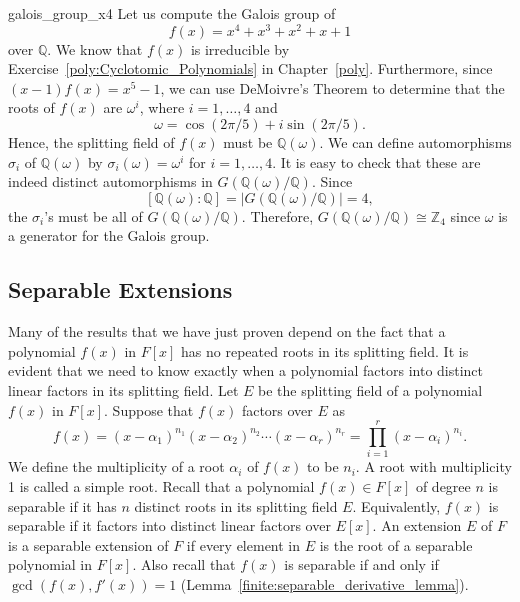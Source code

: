 \begin{example}{galois_group_x4}
Let us compute the Galois group of 
\[
f(x) = x^4 + x^3 + x^2 + x + 1
\]
over ${\mathbb Q}$. We know that $f(x)$ is irreducible by Exercise~\ref{poly:Cyclotomic_Polynomials} in
Chapter~\ref{poly}.  Furthermore, since $(x -1)f(x) = x^5 -1$, we can use
DeMoivre's Theorem to determine that the roots of $f(x)$ are
$\omega^i$,  where  $i = 1, \ldots, 4$ and 
\[
\omega = \cos(2 \pi / 5 ) + i \sin(2 \pi / 5 ).
\]
Hence, the splitting field of $f(x)$ must be ${\mathbb Q}(\omega)$.  We 
can define automorphisms $\sigma_i$ of ${\mathbb Q}(\omega )$ by 
$\sigma_i( \omega ) = \omega^i$ for $i = 1, \ldots, 4$.  It is easy to check
that these are indeed distinct automorphisms in $G( {\mathbb Q}( \omega)
/ {\mathbb Q} )$.  Since 
\[
[{\mathbb Q}( \omega) : {\mathbb Q}] = | G( {\mathbb Q}(
\omega) / {\mathbb Q})| = 4,
\]
the $\sigma_i$'s must be all of $G( {\mathbb
Q}( \omega) / {\mathbb Q} )$. Therefore, $G({\mathbb Q}( \omega) / {\mathbb Q})
\cong {\mathbb Z}_4$ since $\omega$ is a generator for the Galois group. 
\end{example}
 
 
 
\subsection*{Separable Extensions}
 
 
Many of the results that we have just proven depend on the fact that a
polynomial $f(x)$ in $F[x]$ has no repeated roots in its splitting
field. It is evident that we need to know exactly when a
polynomial factors into distinct linear factors in its splitting
field. Let $E$ be the splitting field of a polynomial $f(x)$ in $F[x]$.
Suppose that $f(x)$ factors over $E$ as
\[
f(x) = (x - \alpha_1)^{n_1} (x - \alpha_2)^{n_2} \cdots (x -
\alpha_r)^{n_r} = \prod_{i=1}^{r} (x - \alpha_i)^{n_i}.
\]
We define the {\bfi multiplicity\/} of a root $\alpha_i$ of $f(x)$ to be
$n_i$.  A root with multiplicity 1 is called a {\bfi simple
root}. Recall that a polynomial $f(x) \in F[x]$ of
degree $n$ is {\bfi separable\/} if it has
$n$ distinct roots in its splitting field $E$. Equivalently, $f(x)$ is
separable if it factors into distinct linear factors over $E[x]$.
An extension $E$ of $F$ is a {\bfi separable
extension\/} of $F$ if every element in $E$
is the root of a separable polynomial in $F[x]$. Also recall that
$f(x)$ is separable if and only if $\gcd( f(x), f'(x)) = 1$
(Lemma~\ref{finite:separable_derivative_lemma}). 
 
